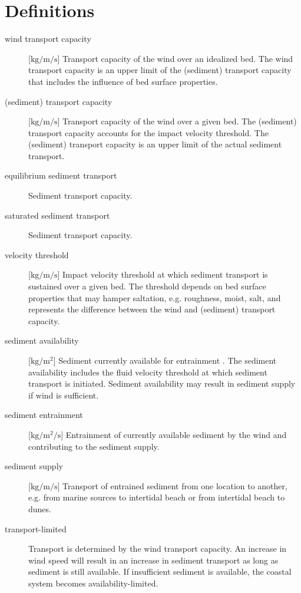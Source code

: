 \chapter*{Definitions}
\label{ch:definitions}

\begin{description}
\item[wind transport capacity] [$\mathrm{kg/m/s}$] Transport capacity
  of the wind over an idealized bed. The wind transport capacity is an
  upper limit of the (sediment) transport capacity that includes the
  influence of bed surface properties.
\item[(sediment) transport capacity] [$\mathrm{kg/m/s}$] Transport
  capacity of the wind over a given bed. The (sediment) transport
  capacity accounts for the impact velocity threshold. The (sediment)
  transport capacity is an upper limit of the actual sediment
  transport.
\item[equilibrium sediment transport] Sediment transport capacity.
\item[saturated sediment transport] Sediment transport capacity.
\item[velocity threshold] [$\mathrm{kg/m/s}$] Impact velocity
  threshold at which sediment transport is sustained over a given
  bed. The threshold depends on bed surface properties that may hamper
  saltation, e.g. roughness, moist, salt, and represents the
  difference between the wind and (sediment) transport capacity.
\item[sediment availability] [$\mathrm{kg/m^2}$] Sediment currently
  available for entrainment \citep[following ][]{Kocurek1999}. The
  sediment availability includes the fluid velocity threshold at which
  sediment transport is initiated. Sediment availability may result in
  sediment supply if wind is sufficient.
\item[sediment entrainment] [$\mathrm{kg/m^2/s}$] Entrainment of
  currently available sediment by the wind and contributing to the
  sediment supply.
\item[sediment supply] [$\mathrm{kg/m/s}$] Transport of entrained
  sediment from one location to another, e.g. from marine sources to
  intertidal beach or from intertidal beach to dunes.
\item[transport-limited] Transport is determined by the wind transport
  capacity. An increase in wind speed will result in an increase in
  sediment transport as long as sediment is still available. If
  insufficient sediment is available, the coastal system becomes
  availability-limited.

\end{description}
